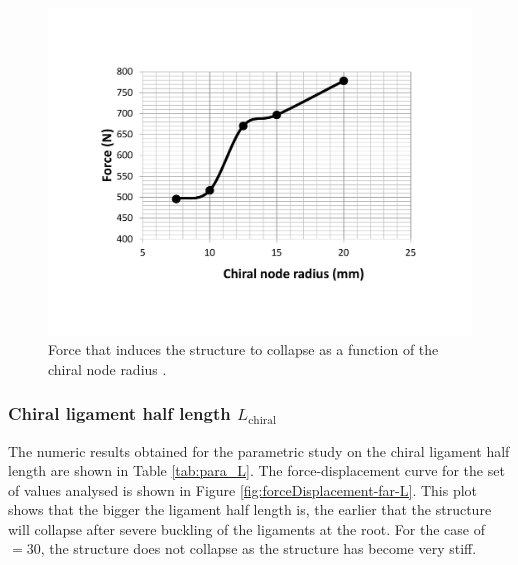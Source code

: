       \begin{figure}[!htpb] %
        \centering
        \includegraphics[width=0.8 \textwidth]{../figures/result-sim/r/force_r}
        \caption[Force that induces the structure to collapse as a function of the chiral node depth]{Force that induces the structure to collapse as a function of the chiral node radius \chir.}\label{fig:force_r}
      \end{figure}

    \subsubsection{Chiral ligament half length $L_{\mathrm{chiral}}$}

      The numeric results obtained for the parametric study on the chiral ligament half length \chiL are shown in Table \ref{tab:para_L}. The force-displacement curve for the set of values analysed is shown in Figure \ref{fig:forceDisplacement-far-L}. This plot shows that the bigger the ligament half length is, the earlier that the structure will collapse after severe buckling of the ligaments at the root. For the case of \chiL$= 30$, the structure does not collapse as the structure has become very stiff.    

